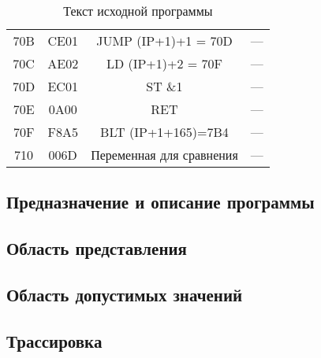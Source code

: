 \begin{table}[h!]
\begin{longtable}{| c | c | c | p{9.5cm} |}
        70B   & CE01        & JUMP (IP+1)+1 = 70D & ---                                                   \\
        70C   & AE02        & LD (IP+1)+2 = 70F   & ---                                                   \\
        70D   & EC01        & ST \&1              & ---                                                   \\
        70E   & 0A00        & RET                 & ---                                                   \\
        70F   & F8A5        & BLT (IP+1+165)=7B4  & ---                                                   \\
        710 & 006D & Переменная для сравнения & --- \\
        \hline
    \end{longtable}
    \caption{Текст исходной программы}
\end{table}

\subsection{Предназначение и описание программы}
\subsection{Область представления}
\subsection{Область допустимых значений}
\subsection{Трассировка}
